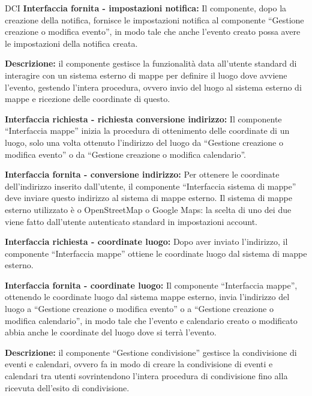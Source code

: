\begin{listaPersonale}{DCI}
    \textbf{Interfaccia fornita - impostazioni notifica:} Il componente, dopo la creazione della notifica, fornisce le impostazioni notifica al componente “Gestione creazione o modifica evento”, in modo tale che anche l'evento creato possa avere le impostazioni della notifica creata.



    \textbf{Descrizione:} il componente gestisce la funzionalità data all'utente standard di interagire con un sistema esterno di mappe per definire il luogo dove avviene l'evento, gestendo l'intera procedura, ovvero invio del luogo al sistema esterno di mappe e ricezione delle coordinate di questo.

    \textbf{Interfaccia richiesta - richiesta conversione indirizzo:}   Il componente “Interfaccia mappe” inizia la procedura di ottenimento delle coordinate di un luogo, solo una volta ottenuto l'indirizzo del luogo da “Gestione creazione o modifica evento” o da “Gestione creazione o modifica calendario”.

    \textbf{Interfaccia fornita - conversione indirizzo:} Per ottenere le coordinate dell'indirizzo inserito dall'utente, il componente “Interfaccia sistema di mappe” deve inviare questo indirizzo al sistema di mappe esterno. Il sistema di mappe esterno utilizzato è o OpenStreetMap o Google Maps: la scelta di uno dei due viene fatto dall'utente autenticato standard in impostazioni account.

    \textbf{Interfaccia richiesta - coordinate luogo:} Dopo aver inviato l'indirizzo, il componente “Interfaccia mappe” ottiene le coordinate luogo dal sistema di mappe esterno.

    \textbf{Interfaccia fornita - coordinate luogo:} Il componente “Interfaccia mappe”, ottenendo le coordinate luogo dal sistema mappe esterno, invia l'indirizzo del luogo a “Gestione creazione o modifica evento” o a “Gestione creazione o modifica calendario”, in modo tale che l'evento e calendario creato o modificato abbia anche le coordinate del luogo dove si terrà l'evento.




    \textbf{Descrizione:} il componente “Gestione condivisione” gestisce la condivisione di eventi e calendari, ovvero fa in modo di creare la condivisione di eventi e calendari tra utenti sovrintendono l'intera procedura di condivisione fino alla ricevuta dell'esito di condivisione.


\end{listaPersonale}
